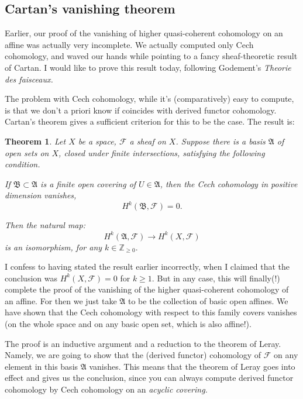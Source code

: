 \documentclass{article}
\newtheorem{theorem}{Theorem}
\begin{document}
\subsection{Cartan's vanishing theorem}

Earlier, our proof of the vanishing of higher quasi-coherent cohomology on an
affine was actually very incomplete. We actually computed only Cech cohomology,
and waved our hands while pointing to a fancy sheaf-theoretic result of Cartan.
I would like to prove this result today, following Godement's \emph{Theorie des
faisceaux.}

The problem with Cech cohomology, while it's (comparatively) easy to compute,
is that we don't a priori know if coincides with derived functor cohomology.
Cartan's theorem gives a sufficient criterion for this to be the case.
The result is:

\begin{theorem} 
Let $X$ be a space, $\mathcal{F}$  a sheaf on $X$. Suppose there is a basis
$\mathfrak{A} $ of open sets on $X$, closed under finite intersections,
satisfying the following condition.

If $\mathfrak{B} \subset \mathfrak{A}$ is a finite open covering of $U \in
\mathfrak{A}$, then the Cech cohomology in positive dimension vanishes,
\[ H^k(\mathfrak{B}, \mathcal{F})=0.  \]

Then the natural map:
\[ H^k(\mathfrak{A}, \mathcal{F}) \to H^k(X, \mathcal{F})  \]
is an isomorphism, for any $k \in \mathbb{Z}_{\geq 0}.$
\end{theorem} 

I confess to having stated the result earlier incorrectly, when I claimed that
the conclusion was $H^k(X, \mathcal{F})=0$ for $k \geq 1$. But in any case,
this will finally(!) complete the proof of the vanishing of the higher
quasi-coherent cohomology of an affine. For then we just take $\mathfrak{A}$ to
be the collection of basic open affines. We have shown that the Cech cohomology
with respect to this family covers vanishes (on the whole space and on any
basic open set, which is also affine!).

The proof is an inductive argument and a reduction to the theorem of Leray.
Namely, we are going to show that the (derived functor) cohomology of $\mathcal{F}$ on any
element in this basis $\mathfrak{A}$ vanishes. 
This means that the theorem of Leray goes into effect and gives us the
conclusion, since you can always compute derived functor cohomology by Cech
cohomology on an \emph{acyclic covering.}
\end{document}
